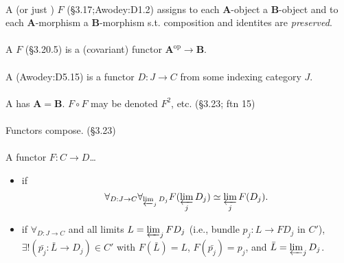 \documentclass[10pt,twocolumn,letterpaper]{article}
\begin{document}
  \paragraph{}
  A  (or just ) $F$
  (\S3.17;Awodey:D1.2) assigns to each $\mathbf{A}$-object a
  $\mathbf{B}$-object and to each $\mathbf{A}$-morphism a
  $\mathbf{B}$-morphism s.t. composition and identites are {\em preserved}.

  \paragraph{}
  A  $F$ (\S3.20.5) is a (covariant) functor
  $\mathbf{A}^\text{op} \to \mathbf{B}$.

  \paragraph{}
  A  (Awodey:D5.15) is a functor $D : J \to C$ from some
  indexing category $J$.

  \paragraph{}
  A  has $\mathbf{A} = \mathbf{B}$.  $F \circ F$ may be
  denoted $F^2$, etc. (\S3.23; ftn 15)

  \paragraph{}
  Functors compose. (\S3.23)

  \paragraph{}
  A functor $F : C \to D$\dots
  \begin{itemize}
    \item {} if
      \[ \forall_{D : J \to C}\forall_{\varprojlim_j D_j} F(\varprojlim_j D_j) \simeq \varprojlim_j F(D_j).\]

    \item {} if $\forall_{D : J \to C}$
      and all limits $L = \varprojlim_j FD_j$ (i.e., bundle $p_j : L \to FD_j$ in $C'$),
      $\exists! (\bar{p_j} : \bar{L} \to D_j) \in C'$ with $F(\bar L) = L$, $F(\bar{p_j}) = p_j$,
      and $\bar L = \varprojlim_j D_j$. 
  \end{itemize}
\end{document}
